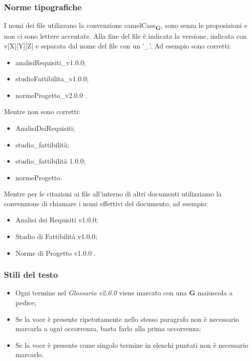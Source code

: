 \subsubsection{Norme tipografiche}
I nomi dei file utilizzano la convenzione camelCase\textsubscript{\textbf{G}}, sono senza le proposizioni e non ci sono lettere accentate.
Alla fine del file è indicata la versione, indicata con v[X][Y][Z] e separata dal nome del file con un '\_'.
Ad esempio sono corretti:
\begin{itemize}
    \item analisiRequisiti\_v1.0.0;
    \item studioFattibilita\_v1.0.0;
    \item normeProgetto\_v2.0.0 .
\end{itemize}
Mentre non sono corretti:
\begin{itemize}
    \item AnalisiDeiRequisiti;
    \item studio\_fattibilità;
    \item studio\_fattibilità 1.0.0;
    \item normeProgetto.
\end{itemize}

Mentre per le citazioni ai file all'interno di altri documenti utilizziamo la convenzione di chiamare i nomi effettivi del documento, ad esempio:
\begin{itemize}
    \item Analisi dei Requisiti v1.0.0;
    \item Studio di Fattibilità v1.0.0;
    \item Norme di Progetto v1.0.0 .
\end{itemize}

\subsubsection{Stili del testo}

\begin{itemize}
    \item Ogni termine nel \textit{Glossario v2.0.0} viene marcato con una \textbf{G} maiuscola a pedice;
    \item Se la voce è presente ripetutamente nello stesso paragrafo non è necessario marcarla a ogni occorrenza, basta farlo alla prima occorrenza;
    \item Se la voce è presente come singolo termine in elenchi puntati non è necessario marcarlo.
\end{itemize}

